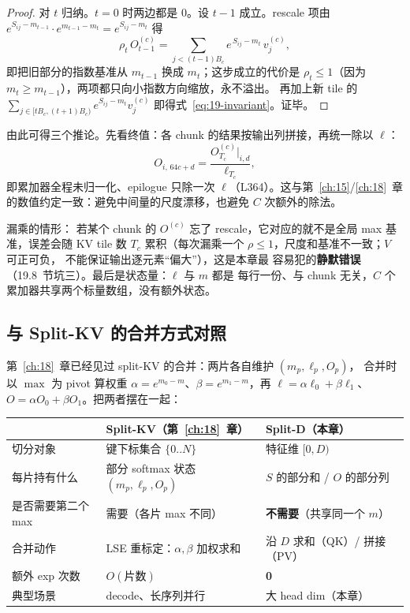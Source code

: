 \begin{proof}
  对 $t$ 归纳。$t=0$ 时两边都是 0。设 $t-1$ 成立。rescale 项由
  $e^{S_{ij}-m_{t-1}} \cdot e^{m_{t-1}-m_t} = e^{S_{ij}-m_t}$ 得
  \begin{equation*}
    \rho_t\, O^{(c)}_{t-1}
      = \sum_{j < (t-1)B_c} e^{\,S_{ij} - m_t}\, v^{(c)}_j ,
  \end{equation*}
  即把旧部分的指数基准从 $m_{t-1}$ 换成 $m_t$；这步成立的代价是
  $\rho_t \le 1$（因为 $m_t \ge m_{t-1}$），两项都只向小指数方向缩放，永不溢出。
  再加上新 tile 的 $\sum_{j \in [tB_c, (t+1)B_c)} e^{S_{ij}-m_t} v^{(c)}_j$
  即得式~\ref{eq:19-invariant}。证毕。
\end{proof}

由此可得三个推论。先看终值：各 chunk 的结果按输出列拼接，再统一除以 $\ell$：
\begin{equation}
  O_{i,\,64c+d} = \frac{O^{(c)}_{T_c}\big|_{i,d}}{\ell_{T_c}} ,
  \label{eq:19-final}
\end{equation}
即累加器全程未归一化、epilogue 只除一次 $\ell$（L364）。这与第~\ref{ch:15}/\ref{ch:18}~章
的数值约定一致：避免中间量的尺度漂移，也避免 $C$ 次额外的除法。

漏乘的情形：
若某个 chunk 的 $O^{(c)}$ 忘了 rescale，它对应的就不是全局 max 基准，误差会随
KV tile 数 $T_c$ 累积（每次漏乘一个 $\rho \le 1$，尺度和基准不一致；$V$ 可正可负，
不能保证输出逐元素“偏大”），这是本章最
容易犯的\textbf{静默错误}（19.8~节坑三）。最后是状态量：$\ell$ 与 $m$ 都是
每行一份、与 chunk 无关，$C$ 个累加器共享两个标量数组，没有额外状态。

\subsection{与 Split-KV 的合并方式对照}

第~\ref{ch:18}~章已经见过 split-KV 的合并：两片各自维护 $(m_p, \ell_p, O_p)$，
合并时以 $\max$ 为 pivot 算权重 $\alpha = e^{m_0-m}$、$\beta = e^{m_1-m}$，再
$\ell = \alpha \ell_0 + \beta \ell_1$、$O = \alpha O_0 + \beta O_1$。把两者摆在一起：

\begin{center}
\begin{tabular}{lll}
\toprule
 & \textbf{Split-KV}（第~\ref{ch:18}~章） & \textbf{Split-D}（本章） \\
\midrule
切分对象 & 键下标集合 $\{0..N\}$ & 特征维 $[0, D)$ \\
每片持有什么 & 部分 softmax 状态 $(m_p,\ell_p,O_p)$ & $S$ 的部分和 / $O$ 的部分列 \\
是否需要第二个 max & 需要（各片 max 不同） & \textbf{不需要}（共享同一个 $m$） \\
合并动作 & LSE 重标定：$\alpha,\beta$ 加权求和 & 沿 $D$ 求和（QK）/ 拼接（PV） \\
额外 exp 次数 & $O(\text{片数})$ & \textbf{0} \\
典型场景 & decode、长序列并行 & 大 head dim（本章） \\
\bottomrule
\end{tabular}
\end{center}

